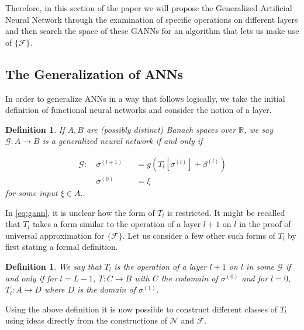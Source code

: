 \documentclass{article}
\newtheorem{definition}[theorem]{Definition}
\begin{document}
Therefore, in this section of the paper we will propose the Generalized Artificial Neural Network through the examination of specific operations on different layers and then search
the space of these GANNs for an algorithm that lets us make use of $\{\mathcal{F}\}.$

\subsection{The Generalization of ANNs}
In order to generalize ANNs in a way that follows logically, we take the initial definition of functional neural networks and consider the notion of a layer.
\begin{definition} If $A,B$ are (possibly distinct) Banach spaces over $\mathbb{R}$,
we say $\mathcal{G}: A \to B$ is a generalized neural network if and only if 

\begin{equation} \label{eq:gann}
          \begin{alignedat}{2}
        \mathcal{G}:\ &\sigma^{(l+1)} & &=  g\left(T_l\left[\sigma^{(l)}\right] + \beta^{(l)}\right)  \\
        &\sigma^{(0)} & &= \xi 
        \end{alignedat}
\end{equation}
for some input $\xi \in A.$.
\end{definition}

In \eqref{eq:gann}, it is unclear how the form of $T_l$ is restricted. It might be recalled that $T_l$ takes a form similar to the operation of a layer $l+1$ on $l$ in the proof of universal approximation for $\{\mathcal{F}\}$. Let us consider a few other such forms of $T_l$ by first stating a formal definition.

\begin{definition}
We say that $T_l$ is the operation of a layer $l+1$ on $l$ in some $\mathcal{G}$ if and only if for $l=L-1$, $T:C\to B$ with $C$ the codomain of $\sigma^{(0)}$ and for $l = 0$, $T_l : A\to D$ where $D$ is the domain of $\sigma^{(1)}.$
\end{definition}

Using the above definition it is now possible to construct different classes of $T_l$ using ideas directly from the constructions of $\mathcal{N}$ and $\mathcal{F}$.
\end{document}
